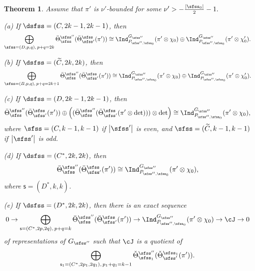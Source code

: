 \documentclass[12pt,a4paper]{amsart}
\def\abs#1{\left|{#1}\right|}
\numberwithin{equation}{section}
\newtheorem{thm}{Theorem}[section]
\theoremstyle{remark}
\def\Thetab{\bar{\Theta}}
\begin{document}
\begin{thm}Assume that $\pi'$  is $\nu'$-bounded for some
$
  \nu'>
 -\frac{\abs{\sfss_0}}{2}-1.
$

\noindent
(a) If $\dsfss=(C,2k-1, 2k-1)$,  then
\[
    \bigoplus_{\sfss=(D,p,q), \, p+q=2k}   \Thetab^{\sfss''}_{\sfss}(\Thetab^{\sfss}_{\sfss'}(\pi'))\cong \Ind_{P_{\sfss'',\sfss_0}}^{G_{\sfss''}} (\pi'\otimes \chi_0)
    \oplus  \Ind_{P_{\sfss'',\sfss_0}}^{G_{\sfss''}} (\pi' \otimes \chi'_0).
    \]

  \smallskip

 \noindent (b) If $\dsfss=(\widetilde C,2k,2k)$,  then
\[
    \bigoplus_{\sfss=(B,p,q), \, p+q=2k+1}  \Thetab^{\sfss''}_{\sfss}(\Thetab^{\sfss}_{\sfss'}(\pi'))\cong \Ind_{P_{\sfss'',\sfss_0}}^{G_{\sfss''}} (\pi'\otimes \chi_0)
    \oplus  \Ind_{P_{\sfss'',\sfss_0}}^{G_{\sfss''}} (\pi' \otimes \chi'_0).
    \]

  \smallskip

    \noindent
(c) If $\dsfss=(D,2k-1,2k-1)$, then
\[
 \Thetab^{\sfss''}_{\sfss}(\Thetab^{\sfss}_{\sfss'}(\pi'))\oplus\left(  (\Thetab^{\sfss''}_{\sfss}(\Thetab^{\sfss}_{\sfss'}(\pi'\otimes \det)))\otimes \det \right)\cong \Ind_{P_{\sfss'',\sfss_0}}^{G_{\sfss''}} (\pi'\otimes \chi_0),
\]
where $\sfss=(C,k-1,k-1)$ if $\abs{\sfss'}$ is even, and  $\sfss=(\widetilde C,k-1,k-1)$ if $\abs{\sfss'}$ is odd.

  \smallskip

\noindent
(d) If $\dsfss=(C^*,2k,2k)$, then
\[
 \Thetab^{\sfss''}_{\sfss}(\Thetab^{\sfss}_{\sfss'}(\pi'))\cong \Ind_{P_{\sfss'',\sfss_0}}^{G_{\sfss''}} (\pi'\otimes \chi_0),
 \]
where $ \mathsf s=(D^*, k, k)$.


\smallskip

\noindent
(e) If $\dsfss=(D^*,2k,2k)$, then there is an exact sequence
\[
 0\rightarrow   \bigoplus_{\mathsf s=(C^*, 2p, 2q), \, p+q=k}  \Thetab^{\sfss''}_{\sfss}(\Thetab^{\sfss}_{\sfss'}(\pi'))\rightarrow \Ind_{P_{\sfss'',\sfss_0}}^{G_{\sfss''}} (\pi'\otimes \chi_0)\rightarrow \cJ\rightarrow 0
\]
 of representations of $G_{\sfss''}$ such that $\cJ$ is a quotient of
\[
\bigoplus_{\mathsf s_1=(C^*, 2p_1, 2q_1), \, p_1+q_1=k-1} \check \Theta^{\sfss''}_{\sfss_1}(\check \Theta^{\sfss_1}_{\sfss'}(\pi')).
\]
\end{thm}
\end{document}
